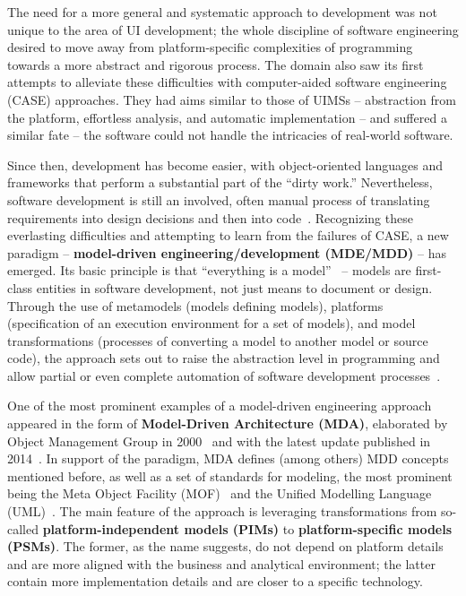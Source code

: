 The need for a more general and systematic approach to development was not unique to the area of UI development;
the whole discipline of software engineering desired to move away from platform-specific complexities of programming towards a more abstract and rigorous process.
The domain also saw its first attempts to alleviate these difficulties with computer-aided software engineering (CASE) approaches.
They had aims similar to those of UIMSs -- abstraction from the platform, effortless analysis, and automatic implementation -- and suffered a similar fate -- the software could not handle the intricacies of real-world software.

Since then, development has become easier, with object-oriented languages and frameworks that perform a substantial part of the \enquote{dirty work.}
Nevertheless, software development is still an involved, often manual process of translating requirements into design decisions and then into code~\cite{Schmidt2006}.
Recognizing these everlasting difficulties and attempting to learn from the failures of CASE, a new paradigm -- \textbf{model-driven engineering/development (MDE/MDD)} -- has emerged.
Its basic principle is that \enquote{everything is a model}~\cite{bezivin2004search} -- models are first-class entities in software development, not just means to document or design.
Through the  use of metamodels (models defining models), platforms (specification of an execution environment for a set of models), and model transformations (processes of converting a model to another model or source code), the approach sets out to raise the abstraction level in programming and allow partial or even complete automation of software development processes~\cite{mellor2004mda}.

One of the most prominent examples of a model-driven engineering approach appeared in the form of \textbf{Model-Driven Architecture (MDA)}, elaborated by Object Management Group in 2000~\cite{richard_soley_model_2000} and with the latest update published in 2014~\cite{mda_2014}.
In support of the paradigm, MDA defines (among others) MDD concepts mentioned before, as well as a set of standards for modeling, the most prominent being the Meta Object Facility (MOF)~ and the Unified Modelling Language (UML)~.
The main feature of the approach is leveraging transformations from so-called \textbf{platform-independent models (PIMs)} to \textbf{platform-specific models (PSMs)}.
The former, as the name suggests, do not depend on platform details and are more aligned with the business and analytical environment;
the latter contain more implementation details and are closer to a specific technology.

